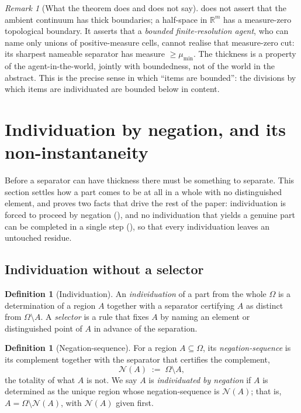 \documentclass[11pt,a4paper]{article}
\theoremstyle{thmstyle}
\theoremstyle{definition}
\newtheorem{definition}[theorem]{Definition}
\theoremstyle{remark}
\newtheorem{remark}[theorem]{Remark}
\newcommand{\R}{\mathbb{R}}
\newcommand{\Space}{\Omega}
\newcommand{\Neg}{\mathcal{N}}
\begin{document}
\begin{remark}[What the theorem does and does not say]
\label{rem:thickness-scope}
 does not assert that the ambient continuum has thick
boundaries; a half-space in $\R^m$ has a measure-zero topological boundary. It
asserts that a \emph{bounded finite-resolution agent}, who can name only unions
of positive-measure cells, cannot realise that measure-zero cut: its sharpest
nameable separator has measure $\ge\mu_{\min}$. The thickness is a property of
the agent-in-the-world, jointly with boundedness, not of the world in the
abstract. This is the precise sense in which ``items are bounded'': the divisions
by which items are individuated are bounded below in content.
\end{remark}


\section{Individuation by negation, and its non-instantaneity}
\label{sec:negation}

Before a separator can have thickness there must be something to separate. This
section settles how a part comes to be at all in a whole with no distinguished
element, and proves two facts that drive the rest of the paper: individuation is
forced to proceed by negation (), and no individuation
that yields a genuine part can be completed in a single step
(), so that every individuation leaves an untouched
residue.

\subsection{Individuation without a selector}

\begin{definition}[Individuation]
\label{def:individuation}
An \emph{individuation} of a part from the whole $\Space$ is a determination of a
region $A$ together with a separator certifying $A$ as distinct from
$\Space\setminus A$. A \emph{selector} is a rule that fixes $A$ by naming an
element or distinguished point of $A$ in advance of the separation.
\end{definition}

\begin{definition}[Negation-sequence]
\label{def:negation}
For a region $A\subseteq\Space$, its \emph{negation-sequence} is its complement
together with the separator that certifies the complement,
\[
\Neg(A)\;:=\;\Space\setminus A,
\]
the totality of what $A$ is not. We say $A$ is \emph{individuated by negation}
if $A$ is determined as the unique region whose negation-sequence is $\Neg(A)$;
that is, $A=\Space\setminus\Neg(A)$, with $\Neg(A)$ given first.
\end{definition}
\end{document}
